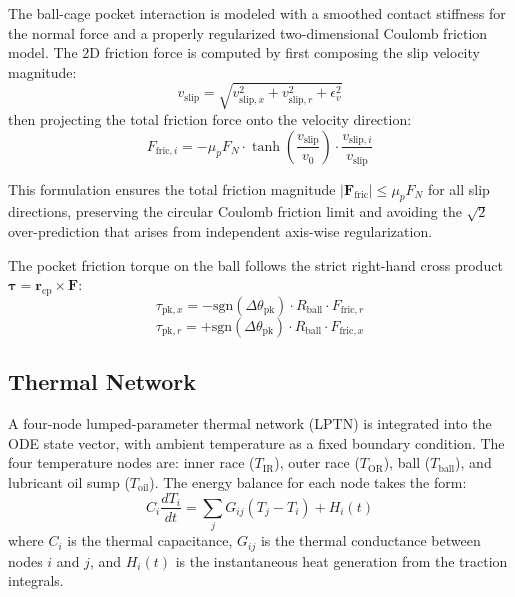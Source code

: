 \documentclass[preprint,12pt]{elsarticle}
\begin{document}
The ball-cage pocket interaction is modeled with a smoothed contact stiffness for the normal force and a properly regularized two-dimensional Coulomb friction model. The 2D friction force is computed by first composing the slip velocity magnitude:
\begin{equation}
    v_{\text{slip}} = \sqrt{v_{\text{slip},x}^2 + v_{\text{slip},r}^2 + \epsilon_v^2}
\end{equation}
then projecting the total friction force onto the velocity direction:
\begin{equation}
    F_{\text{fric},i} = -\mu_p F_N \cdot \tanh\!\left(\frac{v_{\text{slip}}}{v_0}\right) \cdot \frac{v_{\text{slip},i}}{v_{\text{slip}}}
    \label{eq:coulomb_2d}
\end{equation}

This formulation ensures the total friction magnitude $|\bm{F}_{\text{fric}}| \leq \mu_p F_N$ for all slip directions, preserving the circular Coulomb friction limit and avoiding the $\sqrt{2}$ over-prediction that arises from independent axis-wise regularization.

The pocket friction torque on the ball follows the strict right-hand cross product $\bm{\tau} = \bm{r}_{\text{cp}} \times \bm{F}$:
\begin{equation}
    \tau_{\text{pk},x} = -\text{sgn}(\Delta\theta_{\text{pk}}) \cdot R_{\text{ball}} \cdot F_{\text{fric},r}
\end{equation}
\begin{equation}
    \tau_{\text{pk},r} = +\text{sgn}(\Delta\theta_{\text{pk}}) \cdot R_{\text{ball}} \cdot F_{\text{fric},x}
\end{equation}


\subsection{Thermal Network}
\label{sec:thermal}

A four-node lumped-parameter thermal network (LPTN) is integrated into the ODE state vector, with ambient temperature as a fixed boundary condition. The four temperature nodes are: inner race ($T_{\text{IR}}$), outer race ($T_{\text{OR}}$), ball ($T_{\text{ball}}$), and lubricant oil sump ($T_{\text{oil}}$). The energy balance for each node takes the form:
\begin{equation}
    C_i \frac{dT_i}{dt} = \sum_j G_{ij}(T_j - T_i) + H_i(t)
    \label{eq:thermal_ode}
\end{equation}
where $C_i$ is the thermal capacitance, $G_{ij}$ is the thermal conductance between nodes $i$ and $j$, and $H_i(t)$ is the instantaneous heat generation from the traction integrals.
\end{document}
